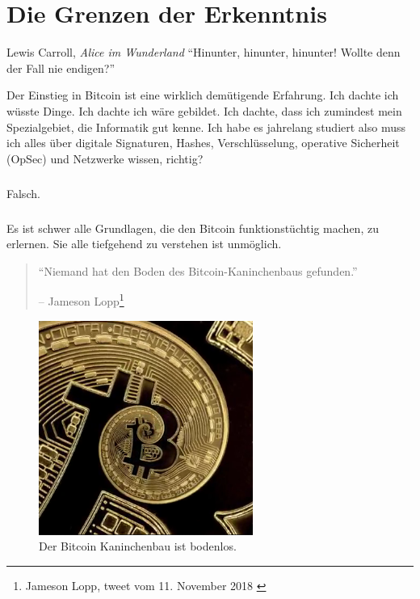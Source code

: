 \chapter{Die Grenzen der Erkenntnis}
\label{les:7}

\begin{chapquote}{Lewis Carroll, \textit{Alice im Wunderland}}
\enquote{Hinunter, hinunter, hinunter! Wollte denn der Fall nie endigen?}
\end{chapquote}

Der Einstieg in Bitcoin ist eine wirklich demütigende Erfahrung. Ich dachte ich
wüsste Dinge. Ich dachte ich wäre gebildet. Ich dachte, dass ich zumindest mein
Spezialgebiet, die Informatik gut kenne. Ich habe es jahrelang studiert also
muss ich alles über digitale Signaturen, Hashes, Verschlüsselung, operative
Sicherheit (OpSec) und Netzwerke wissen, richtig?

\paragraph{}
Falsch.

\paragraph{}
Es ist schwer alle Grundlagen, die den Bitcoin funktionstüchtig machen, zu
erlernen. Sie alle tiefgehend zu verstehen ist unmöglich.

\begin{quotation}\begin{samepage}
\enquote{Niemand hat den Boden des Bitcoin-Kaninchenbaus gefunden.}
\begin{flushright} -- Jameson Lopp\footnote{Jameson Lopp, tweet vom 11. November 2018 \cite{lopp-tweet}}
\end{flushright}\end{samepage}\end{quotation}

\begin{figure}
  \centering
  \includegraphics[width=7cm]{assets/images/rabbit-hole-bottomless.png}
  \caption{Der Bitcoin Kaninchenbau ist bodenlos.}
  \label{fig:rabbit-hole-bottomless}
\end{figure}

